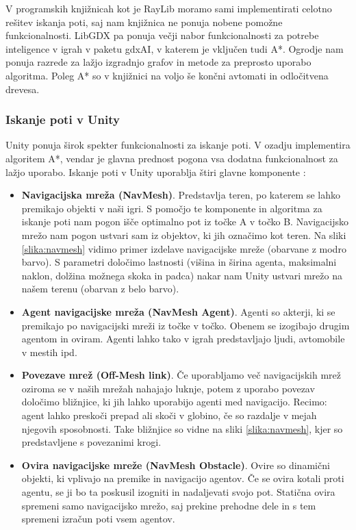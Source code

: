 \documentclass[12pt,a4paper,twoside]{book}
\begin{document}
V programskih knjižnicah kot je RayLib moramo sami implementirati celotno rešitev iskanja poti, saj nam knjižnica ne ponuja nobene pomožne funkcionalnosti. LibGDX pa ponuja večji nabor funkcionalnosti za potrebe inteligence v igrah v paketu gdxAI, v katerem je vključen tudi A*. Ogrodje nam ponuja razrede za lažjo izgradnjo grafov in metode za preprosto uporabo algoritma. Poleg A* so v knjižnici na voljo še končni avtomati in odločitvena drevesa.

\subsubsection{Iskanje poti v Unity}

Unity ponuja širok spekter funkcionalnosti za iskanje poti. V ozadju implementira algoritem A*, vendar je glavna prednost pogona vsa dodatna funkcionalnost za lažjo uporabo. Iskanje poti v Unity uporablja štiri glavne komponente \cite{navmesh}:
\begin{itemize}
	\item \textbf{Navigacijska mreža (NavMesh)}. Predstavlja teren, po katerem se lahko premikajo objekti v naši igri. S pomočjo te komponente in algoritma za iskanje poti nam pogon išče optimalno pot iz točke A v točko B. Navigacijsko mrežo nam pogon ustvari sam iz objektov, ki jih označimo kot teren. Na sliki \ref{slika:navmesh} vidimo primer izdelave navigacijske mreže (obarvane z modro barvo). S parametri določimo lastnosti (višina in širina agenta, maksimalni naklon, dolžina možnega skoka in padca) nakar nam Unity ustvari mrežo na našem terenu (obarvan z belo barvo).
	\item \textbf{Agent navigacijske mreža (NavMesh Agent)}. Agenti so akterji, ki se premikajo po navigacijski mreži iz točke v točko. Obenem se izogibajo drugim agentom in oviram. Agenti lahko tako v igrah predstavljajo ljudi, avtomobile v mestih ipd.
	\item \textbf{Povezave mrež (Off-Mesh link)}. Če uporabljamo več navigacijskih mrež oziroma se v naših mrežah nahajajo luknje, potem z uporabo povezav določimo bližnjice, ki jih lahko uporabijo agenti med navigacijo. Recimo: agent lahko preskoči prepad ali skoči v globino, če so razdalje v mejah njegovih sposobnosti. Take bližnjice so vidne na sliki \ref{slika:navmesh}, kjer so predstavljene s povezanimi krogi.
	\item \textbf{Ovira navigacijske mreže (NavMesh Obstacle)}. Ovire so dinamični objekti, ki vplivajo na premike in navigacijo agentov. Če se ovira kotali proti agentu, se ji bo ta poskusil izogniti in nadaljevati svojo pot. Statična ovira spremeni samo navigacijsko mrežo, saj prekine prehodne dele in s tem spremeni izračun poti vsem agentov. 
\end{itemize}
\end{document}
